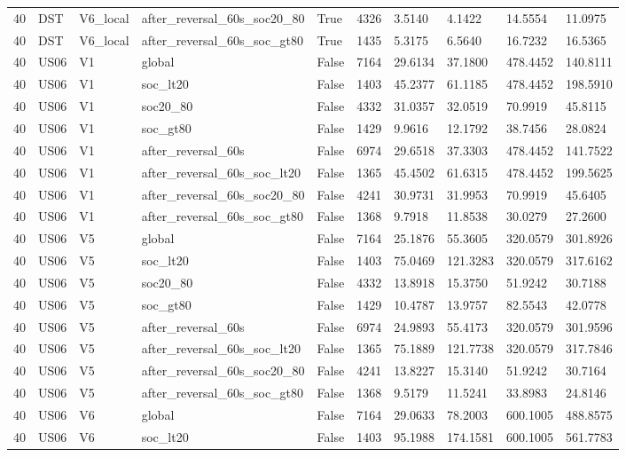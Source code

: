 \begin{tabular}{llllllllll}
40 & DST & V6\_local & after\_reversal\_60s\_soc20\_80 & True & 4326 & 3.5140 & 4.1422 & 14.5554 & 11.0975 \\
40 & DST & V6\_local & after\_reversal\_60s\_soc\_gt80 & True & 1435 & 5.3175 & 6.5640 & 16.7232 & 16.5365 \\
40 & US06 & V1 & global & False & 7164 & 29.6134 & 37.1800 & 478.4452 & 140.8111 \\
40 & US06 & V1 & soc\_lt20 & False & 1403 & 45.2377 & 61.1185 & 478.4452 & 198.5910 \\
40 & US06 & V1 & soc20\_80 & False & 4332 & 31.0357 & 32.0519 & 70.9919 & 45.8115 \\
40 & US06 & V1 & soc\_gt80 & False & 1429 & 9.9616 & 12.1792 & 38.7456 & 28.0824 \\
40 & US06 & V1 & after\_reversal\_60s & False & 6974 & 29.6518 & 37.3303 & 478.4452 & 141.7522 \\
40 & US06 & V1 & after\_reversal\_60s\_soc\_lt20 & False & 1365 & 45.4502 & 61.6315 & 478.4452 & 199.5625 \\
40 & US06 & V1 & after\_reversal\_60s\_soc20\_80 & False & 4241 & 30.9731 & 31.9953 & 70.9919 & 45.6405 \\
40 & US06 & V1 & after\_reversal\_60s\_soc\_gt80 & False & 1368 & 9.7918 & 11.8538 & 30.0279 & 27.2600 \\
40 & US06 & V5 & global & False & 7164 & 25.1876 & 55.3605 & 320.0579 & 301.8926 \\
40 & US06 & V5 & soc\_lt20 & False & 1403 & 75.0469 & 121.3283 & 320.0579 & 317.6162 \\
40 & US06 & V5 & soc20\_80 & False & 4332 & 13.8918 & 15.3750 & 51.9242 & 30.7188 \\
40 & US06 & V5 & soc\_gt80 & False & 1429 & 10.4787 & 13.9757 & 82.5543 & 42.0778 \\
40 & US06 & V5 & after\_reversal\_60s & False & 6974 & 24.9893 & 55.4173 & 320.0579 & 301.9596 \\
40 & US06 & V5 & after\_reversal\_60s\_soc\_lt20 & False & 1365 & 75.1889 & 121.7738 & 320.0579 & 317.7846 \\
40 & US06 & V5 & after\_reversal\_60s\_soc20\_80 & False & 4241 & 13.8227 & 15.3140 & 51.9242 & 30.7164 \\
40 & US06 & V5 & after\_reversal\_60s\_soc\_gt80 & False & 1368 & 9.5179 & 11.5241 & 33.8983 & 24.8146 \\
40 & US06 & V6 & global & False & 7164 & 29.0633 & 78.2003 & 600.1005 & 488.8575 \\
40 & US06 & V6 & soc\_lt20 & False & 1403 & 95.1988 & 174.1581 & 600.1005 & 561.7783 \\

\end{tabular}

